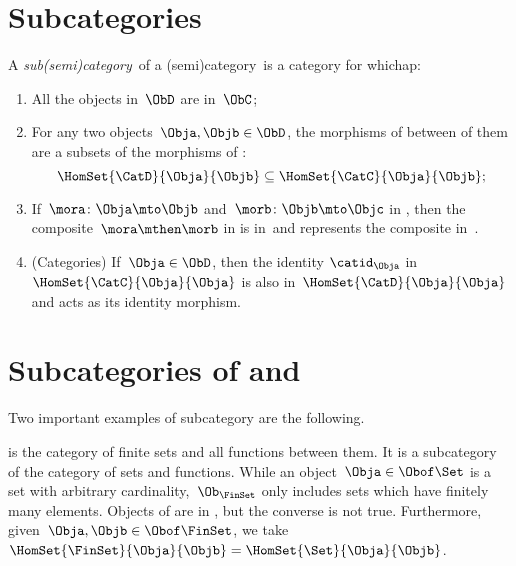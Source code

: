 
\section{Subcategories}
\label{sec:subcategories}


\begin{ctdefinition}[Subcategory]
    \label{def:subcategory}
    A \emph{sub(semi)category}~\CatD of a (semi)category~\CatC is a category for whichap:
    \begin{enumerate}
        \item All the objects in~$\ObD$ are in~$\ObC$;
        \item For any two objects~$\Obja,\Objb\in \ObD$,
              the morphisms of \CatD between of them are a subsets of the morphisms of \CatC:
              \begin{equation}
                  \HomSet{\CatD}{\Obja}{\Objb}\subseteq \HomSet{\CatC}{ \Obja}{\Objb};
              \end{equation}
        \item If~$\mora \colon \Obja \mto \Objb$ and~$\morb\colon \Objb\mto \Objc$ in \CatD, then the composite~$\mora \mthen \morb$ in \CatC is in~\CatD and represents the composite in~\CatD.
        \item (Categories) If~$\Obja\in \ObD$, then the identity $\catid_\Obja$ in $\HomSet{\CatC}{\Obja}{\Obja}$ is also in~$\HomSet{\CatD}{\Obja}{\Obja}$ and acts as its identity morphism.
    \end{enumerate}
\end{ctdefinition}

\section{Subcategories of \Rel and \Set}

Two important examples of subcategory are the following.

\begin{example}[\FinSet]
    \label{ex:FinSet}
    \iindex{\FinSet} is the category of finite sets and all functions between them.
    It is a subcategory of the category \Set of sets and functions.
    While an object~$\Obja \in \Obof\Set$ is a set with arbitrary cardinality,~$\Ob_{\FinSet}$ only includes sets which have finitely many elements.
    Objects of \FinSet are in \Set, but the converse is not true.
    Furthermore, given~$\Obja,\Objb\in \Obof\FinSet$, we take~$\HomSet{\FinSet}{\Obja}{\Objb} =\HomSet{\Set}{\Obja}{\Objb}$.
\end{example}

